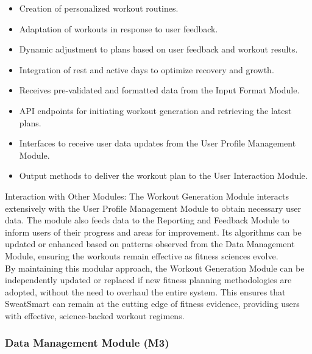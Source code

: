 \documentclass[12pt, titlepage]{article}
\begin{document}
\begin{description}[leftmargin=0pt]
\item[Services:] 
\end{description}
\begin{itemize}[leftmargin=*]
\item Creation of personalized workout routines.
\item Adaptation of workouts in response to user feedback.
\item Dynamic adjustment to plans based on user feedback and workout results.
\item Integration of rest and active days to optimize recovery and growth.
\item Receives pre-validated and formatted data from the Input Format Module.
\end{itemize}

\begin{description}[leftmargin=0pt]
\item[Interfaces:] 
\end{description}
\begin{itemize}[leftmargin=*]
\item API endpoints for initiating workout generation and retrieving the latest plans.
\item Interfaces to receive user data updates from the User Profile Management Module.
\item Output methods to deliver the workout plan to the User Interaction Module.
\end{itemize}

Interaction with Other Modules: The Workout Generation Module interacts extensively with the User Profile Management Module to obtain necessary user data. The module also feeds data to the Reporting and Feedback Module to inform users of their progress and areas for improvement. Its algorithms can be updated or enhanced based on patterns observed from the Data Management Module, ensuring the workouts remain effective as fitness sciences evolve.
\\

By maintaining this modular approach, the Workout Generation Module can be independently updated or replaced if new fitness planning methodologies are adopted, without the need to overhaul the entire system. This ensures that SweatSmart can remain at the cutting edge of fitness evidence, providing users with effective, science-backed workout regimens.

\subsubsection{Data Management Module (M3)}
\end{document}
